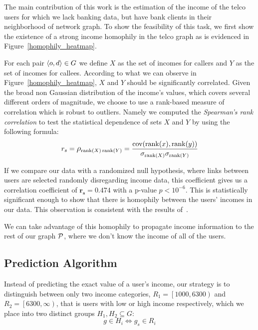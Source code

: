 The main contribution of this work is the estimation of the income of the telco users for which we lack banking data, but have bank clients in their neighborhood of network graph. To show the feasibility of this task, we first show the existence of a strong income homophily in the telco graph as is evidenced in Figure~\ref{homophily_heatmap}.


For each pair \( \left< o, d \right> \in \mathlarger{G} \) we define \( X \) as the set of incomes for callers and \( Y \) as the set of incomes for callees. According to what we can observe in Figure~\ref{homophily_heatmap}, \( X \) and \( Y \) should be significantly correlated. Given the broad non Gaussian distribution of the income's values, which covers several different  orders of magnitude, we choose to use a rank-based measure of correlation which is robust to outliers.
Namely we computed the \textit{Spearman's rank correlation} %
to test the statistical dependence of sets \( X \) and \( Y \) by using the following formula:
\begin{equation}
r_s = \mathlarger{\rho}_{\operatorname{rank}(X) \operatorname{rank}(Y)} = \frac{\operatorname{cov}(\operatorname{rank}(x), \operatorname{rank}(y))}{\sigma_{\operatorname{rank}(X)} \sigma_{\operatorname{rank}(Y)}}
\label{spearman}
\end{equation}

If we compare our data with a randomized null hypothesis, where links between users are selected randomly disregarding income data, this coefficient gives us a correlation coefficient of $\mathbf{r_s = 0.474} $ with a p-value $ p < 10^{-6} $. This is statistically significant enough to show that there is homophily between the users' incomes in our data.
This observation is consistent with the results of~\cite{leo2015socioeconomic}.

We can take advantage of this homophily to propagate income information to the rest of our graph $ \mathcal{P} $, where we don't know the income of all of the users.


\subsection{Prediction Algorithm}

Instead of predicting the exact value of a user's income, our strategy is to distinguish between only two income categories, $R_1 = \left[1000, 6300\right)$ and $R_2 = \left[6300, \infty\right)$, that is users with low or high income respectively, which we place into two distinct groups $ H_1, H_2 \subseteq G$:
\[
	g \in H_i \iff g_s \in R_i
\]

